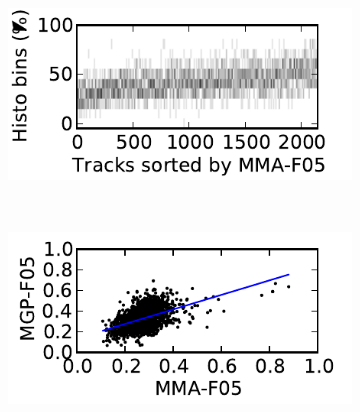 \documentclass{article}
\begin{document}
\begin{figure}
      \centering
      \begin{subfigure}[b]{0.25\textwidth}
              \includegraphics[width=\textwidth]{plots/histo-F05.pdf}
              \caption{}
              \label{fig:histo-F05}
      \end{subfigure}%
      ~ 
      \begin{subfigure}[b]{0.25\textwidth}
              \includegraphics[width=\textwidth]{plots/correl-F05.pdf}
              \caption{}
              \label{fig:correl-F05}
      \end{subfigure}


\end{figure}
\end{document}

